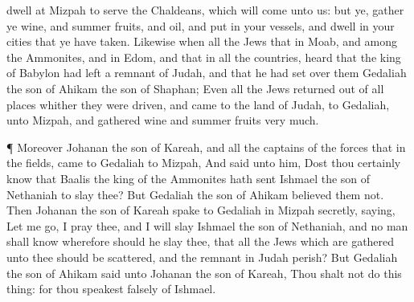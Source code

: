 {dwell at
Mizpah to
serve the
Chaldeans, which will
come unto us: but ye,
gather ye
wine, and summer
fruits, and
oil, and
put
{} in your
vessels, and
dwell in your
cities that ye have
taken.
Likewise when all the
Jews that
{} in
Moab, and among the
Ammonites, and in
Edom, and that
{} in all the
countries,
heard that the
king of
Babylon had
left a
remnant of
Judah, and that he had
set over them
Gedaliah the
son of
Ahikam the
son of
Shaphan;
Even all the
Jews returned
out of all
places whither they were
driven, and
came to the
land of
Judah, to
Gedaliah, unto
Mizpah, and
gathered
wine and summer
fruits
very
much.
\par }{\PP {}¶ Moreover
Johanan the
son of
Kareah, and all the
captains of the
forces that
{} in the
fields,
came to
Gedaliah to
Mizpah,
And
said unto him, Dost thou
certainly
know that
Baalis the
king of the
Ammonites hath
sent
Ishmael the
son of
Nethaniah to
slay thee? But
Gedaliah the
son of
Ahikam
believed them not.
Then
Johanan the
son of
Kareah
spake to
Gedaliah in
Mizpah
secretly,
saying, Let me
go, I pray thee, and I will
slay
Ishmael the
son of
Nethaniah, and no
man shall
know
{} wherefore should he
slay thee, that all the
Jews which are
gathered unto thee should be
scattered, and the
remnant in
Judah
perish?
But
Gedaliah the
son of
Ahikam
said unto
Johanan the
son of
Kareah, Thou shalt not
do this
thing: for thou
speakest
falsely of
Ishmael.

}
